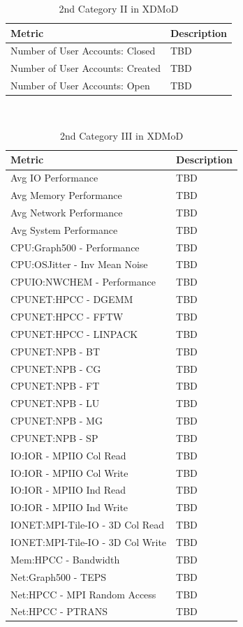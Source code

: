 \documentclass{sig-alternate-05-2015}
\begin{document}
\begin{table}[htb]
  \caption{2nd Category II in XDMoD}
\begin{scriptsize}
\label{T:xdmod22}
 \begin{tabular}{l|l} 
Metric & Description \\
\hline
Number of User Accounts: Closed & TBD \\
Number of User Accounts: Created & TBD \\
Number of User Accounts: Open & TBD \\
\hline
\end{tabular}\\
\end{scriptsize}
\end{table}

\clearpage



\begin{table}[htb]
  \caption{2nd Category III in XDMoD}
\begin{scriptsize}
\label{T:xdmod23}
 \begin{tabular}{l|l} 
Metric & Description \\
\hline
Avg IO Performance & TBD \\
Avg Memory Performance & TBD \\
Avg Network Performance & TBD \\
Avg System Performance & TBD \\
CPU:Graph500 - Performance & TBD \\
CPU:OSJitter - Inv Mean Noise & TBD \\
CPUIO:NWCHEM - Performance & TBD \\
CPUNET:HPCC - DGEMM & TBD \\
CPUNET:HPCC - FFTW & TBD \\
CPUNET:HPCC - LINPACK & TBD \\
CPUNET:NPB - BT & TBD \\
CPUNET:NPB - CG & TBD \\
CPUNET:NPB - FT & TBD \\
CPUNET:NPB - LU & TBD \\
CPUNET:NPB - MG & TBD \\
CPUNET:NPB - SP & TBD \\
IO:IOR - MPIIO Col Read & TBD \\
IO:IOR - MPIIO Col Write & TBD \\
IO:IOR - MPIIO Ind Read & TBD \\
IO:IOR - MPIIO Ind Write & TBD \\
IONET:MPI-Tile-IO - 3D Col Read & TBD \\
IONET:MPI-Tile-IO - 3D Col Write & TBD \\
Mem:HPCC - Bandwidth & TBD \\
Net:Graph500 - TEPS & TBD \\
Net:HPCC - MPI Random Access & TBD \\
Net:HPCC - PTRANS & TBD \\
\hline
\end{tabular}\\
\end{scriptsize}
\end{table}
\end{document}
